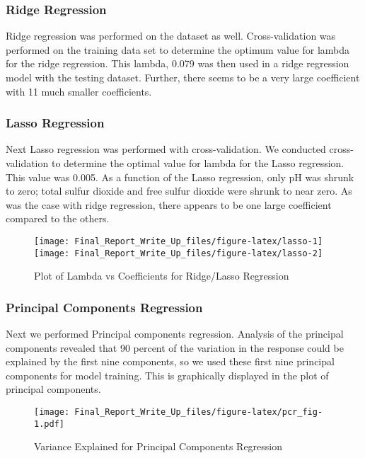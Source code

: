 \documentclass[]{article}
\begin{document}
\subsubsection{Ridge Regression}\label{ridge-regression}

Ridge regression was performed on the dataset as well. Cross-validation
was performed on the training data set to determine the optimum value
for lambda for the ridge regression. This lambda, 0.079 was then used in
a ridge regression model with the testing dataset. Further, there seems
to be a very large coefficient with 11 much smaller coefficients.

\subsubsection{Lasso Regression}\label{lasso-regression}

Next Lasso regression was performed with cross-validation. We conducted
cross-validation to determine the optimal value for lambda for the Lasso
regression. This value was 0.005. As a function of the Lasso regression,
only pH was shrunk to zero; total sulfur dioxide and free sulfur dioxide
were shrunk to near zero. As was the case with ridge regression, there
appears to be one large coefficient compared to the others.

\begin{figure}[H]

{\centering \texttt{[image: Final\_Report\_Write\_Up\_files/figure-latex/lasso-1]} \texttt{[image: Final\_Report\_Write\_Up\_files/figure-latex/lasso-2]} 

}

\caption{Plot of Lambda vs Coefficients for Ridge/Lasso Regression}\label{fig:lasso}
\end{figure}

\subsubsection{Principal Components
Regression}\label{principal-components-regression}

Next we performed Principal components regression. Analysis of the
principal components revealed that 90 percent of the variation in the
response could be explained by the first nine components, so we used
these first nine principal components for model training. This is
graphically displayed in the plot of principal components.

\begin{figure}[htbp]
\centering
\texttt{[image: Final\_Report\_Write\_Up\_files/figure-latex/pcr\_fig-1.pdf]}
\caption{Variance Explained for Principal Components Regression}
\end{figure}
\end{document}
